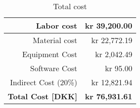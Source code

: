\begin{table}[htbp]
\caption{Total cost}
\begin{center}
\begin{tabular}{r|r}
Labor cost & kr 39,200.00 \\ \hline
Material cost & kr 22,772.19 \\ \hline
Equipment Cost & kr 2,042.49 \\ \hline
Software Cost & kr 95.00 \\ \hline
Indirect Cost (20\%) & kr 12,821.94 \\ \hhline{=|=}
\textbf{Total Cost [DKK]} & \textbf{kr 76,931.61} \\ 
\end{tabular}
\end{center}
\label{tab:total_cost}
\end{table}

